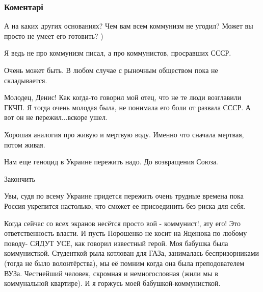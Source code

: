  
 
 
 
 
\subsubsection{Коментарі}

\begin{itemize} %
А на каких других основаниях? Чем вам всем коммунизм не угодил? Может вы просто не умеет его готовить? )

\begin{itemize} %
Я ведь не про коммунизм писал, а про коммунистов, просравших СССР.
\end{itemize} %

Очень может быть. В любом случае с рыночным обществом пока не складывается.


Молодец, Денис! Как когда-то говорил мой отец, что не те люди возглавили ГКЧП.
Я тогда очень молодая была, не понимала его боли от развала СССР. А вот он не
пережил...вскоре ушел.


Хорошая аналогия про живую и мертвую воду. Именно что сначала мертвая, потом живая.

Нам еще геноцид в Украине пережить надо. До возвращения Союза.

\begin{itemize} %
Закончить
\end{itemize} %


Увы, судя по всему Украине придется пережить очень трудные времена пока Россия
укрепится настолько, что сможет ее присоединить без риска для себя.



Когда сейчас со всех экранов несётся просто вой - коммунист!, ату его! Это
ответственность власти. И пусть Порошенко не косит на Яценюка по любому поводу-
СЯДУТ УСЕ, как говорил известный герой. Моя бабушка была коммунисткой. Студенткой
рыла котлован для ГАЗа, занималась беспризорниками (тогда не было
волонтёрства), мы её помним когда она была преподователем ВУЗа. Честнейший
человек, скромная и немногословная (жили мы в коммунальной квартире). И я горжусь
моей бабушкой-коммунисткой.


\end{itemize}

